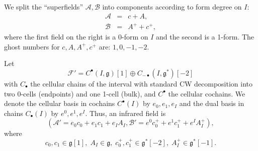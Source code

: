 \documentclass{amsart}
\theoremstyle{plain} %
\theoremstyle{definition}
\theoremstyle{remark}
\newcommand{\g}{\mathfrak{g}}
\newcommand{\mc}{\mathcal}
\newcommand{\bt}{\bullet}
\newcommand{\F}{\mathcal{F}}
\newcommand{\A}{\mathcal{A}}
\newcommand{\B}{\mathcal{B}}
\begin{document}
We split the ``superfields'' $\mc{A},\mc{B}$ into components according to form degree on $I$:
\begin{eqnarray}
    \A &=& c+A,\\
    \B &=& A^+ + c^+,
\end{eqnarray}
where the first field on the right is a 0-form on $I$ and the second is a 1-form. The ghost numbers for $c,A,A^+,c^+$ are: $1,0,-1,-2$.

Let 
\begin{equation}
\F'=C^\bt(I,\g)[1]\oplus C_{-\bt}(I,\g^*)[-2]
\end{equation}
with $C_\bt$ the cellular chains of the interval with standard CW decomposition into two 0-cells (endpoints) and one 1-cell (bulk), and $C^\bt$ the cellular cochains. We denote the cellular basis in cochains $C^\bt(I)$ by $e_0,e_1,e_I$ and the dual basis in chains $C_\bt(I)$ by $e^0,e^1,e^I$. Thus, an infrared field is 
\begin{equation}
    (\A'=e_0 c_0 + e_1 c_1 +e_I A_I, \B'= e^0 c^+_0+e^1 c^+_1+e^I  A^+_I),
\end{equation}
where
\begin{equation}
    c_0,c_1\in \g[1],\; A_I\in \g,\; c^+_0,c^+_1\in \g^*[-2],\; A^+_I\in \g^*[-1].
\end{equation}
\end{document}
